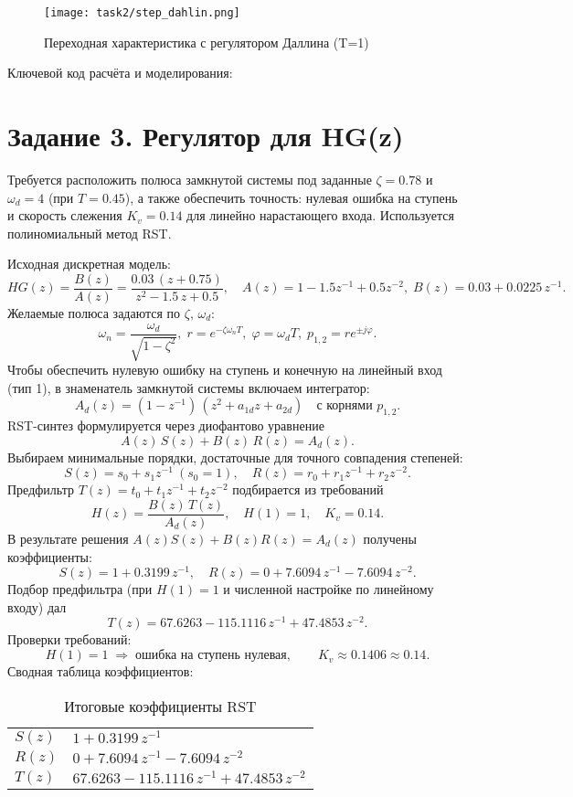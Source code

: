 \begin{figure}[H]
    \centering
    \texttt{[image: task2/step\_dahlin.png]}
    \caption{Переходная характеристика с регулятором Даллина (T=1)}
\end{figure}

\noindent Ключевой код расчёта и моделирования:


\section{Задание 3. Регулятор для HG(z)}
Требуется расположить полюса замкнутой системы под заданные $\zeta=0.78$ и $\omega_d=4$ (при $T=0.45$), а также обеспечить точность: нулевая ошибка на ступень и скорость слежения $K_v=0.14$ для линейно нарастающего входа. Используется полиномиальный метод RST.

Исходная дискретная модель:
\[
    HG(z) = \frac{B(z)}{A(z)} = \frac{0.03\,(z+0.75)}{z^2 - 1.5\,z + 0.5},\quad
    A(z)=1-1.5z^{-1}+0.5z^{-2},\; B(z)=0.03+0.0225\,z^{-1}.
\]
Желаемые полюса задаются по $\zeta,\,\omega_d$:
\[\omega_n = \frac{\omega_d}{\sqrt{1-\zeta^2}},\; r=e^{-\zeta\omega_n T},\; \varphi = \omega_d T,\; p_{1,2}=r e^{\pm j\varphi}.
\]
Чтобы обеспечить нулевую ошибку на ступень и конечную на линейный вход (тип 1), в знаменатель замкнутой системы включаем интегратор: 
\[
    A_d(z)=(1-z^{-1})\,(z^2 + a_{1d} z + a_{2d}) \quad \text{с корнями } p_{1,2}.
\]
RST-синтез формулируется через диофантово уравнение
\[
    A(z)\,S(z) + B(z)\,R(z) = A_d(z).
\]
Выбираем минимальные порядки, достаточные для точного совпадения степеней: 
\[
    S(z)=s_0+s_1 z^{-1}\ (s_0=1),\quad R(z)=r_0+r_1 z^{-1}+r_2 z^{-2}.
\]
Предфильтр \(T(z)=t_0+t_1 z^{-1}+t_2 z^{-2}\) подбирается из требований
\[
    H(z)=\frac{B(z)\,T(z)}{A_d(z)},\quad H(1)=1,\quad K_v=0.14.
\]
\noindent В результате решения $A(z)S(z)+B(z)R(z)=A_d(z)$ получены коэффициенты:
\[
    S(z)=\boxed{1 + 0.3199\,z^{-1}},\quad R(z)=\boxed{0 + 7.6094\,z^{-1} - 7.6094\,z^{-2}}.
\]
Подбор предфильтра (при $H(1)=1$ и численной настройке по линейному входу) дал
\[
    T(z)=\boxed{67.6263 - 115.1116\,z^{-1} + 47.4853\,z^{-2}}.
\]
Проверки требований:
\[
    H(1)=1\;\Rightarrow\; \text{ошибка на ступень нулевая},\qquad K_v\approx 0.1406 \approx 0.14.
\]
Сводная таблица коэффициентов:
\begin{table}[H]
    \centering
    \begin{tabular}{l|l}
        \toprule
        $S(z)$ & $1 + 0.3199\,z^{-1}$ \\
        $R(z)$ & $0 + 7.6094\,z^{-1} - 7.6094\,z^{-2}$ \\
        $T(z)$ & $67.6263 - 115.1116\,z^{-1} + 47.4853\,z^{-2}$ \\
        \bottomrule
    \end{tabular}
    \caption{Итоговые коэффициенты RST}
\end{table}

